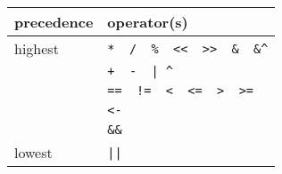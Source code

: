 \begin{tabular}{ll}
\textbf{precedence} & \textbf{operator(s)} \\ \midrule
highest   &	\verb!*  /  %  <<  >>  &  &^!		\\
    &	\verb!+  -  | ^!			\\
    &	\verb+==  !=  <  <=  >  >=+		\\
    &	\verb!<-!				\\
    &	\verb!&&!				\\
lowest    &	\verb!||!				\\
\end{tabular}
